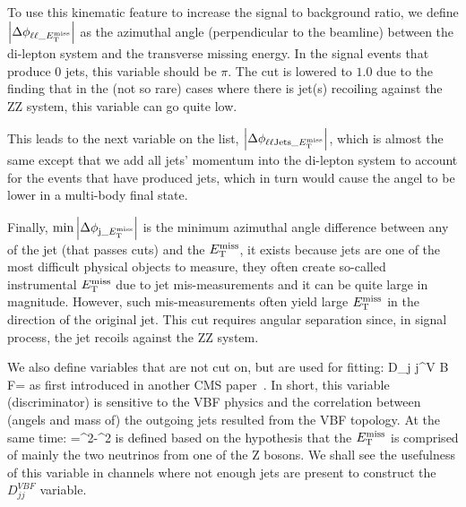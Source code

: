To use this kinematic feature to increase the signal to background ratio, we define 
$\abs{\Delta\phi_{\ell\ell\_E_{\mathrm{T}}^{\mathrm{miss}}}}$ as the azimuthal angle (perpendicular to 
the beamline) between the di-lepton system and the transverse missing energy. In the
signal events that produce 0 jets, this variable should be $\pi$. The cut is lowered to $1.0$ 
due to the finding that in the (not so rare) cases where there is jet(s) recoiling against
the ZZ system, this variable can go quite low.

This leads to the next variable on the list, $\abs{\Delta\phi_{\ell\ell\mathrm{Jets}\_E_{\mathrm{T}}^{\mathrm{miss}}}}$, which
is almost the same except that we add all jets' momentum into the di-lepton system to account
for the events that have produced jets, which in turn would cause the angel to be lower in
a multi-body final state.


Finally, $\min{\abs{ \Delta\phi_{\mathrm{j}\_E_{\mathrm{T}}^{\mathrm{miss}}}}}$ is the minimum azimuthal angle difference between
any of the jet (that passes cuts) and the $E_{\mathrm{T}}^{\mathrm{miss}}$, it exists because jets are one of the 
most difficult physical objects to measure, they often create so-called instrumental $E_{\mathrm{T}}^{\mathrm{miss}}$ due to jet
mis-measurements and it can be quite large in magnitude. However, such mis-measurements often yield large
$E_{\mathrm{T}}^{\mathrm{miss}}$ in the direction of the original jet. This cut requires angular separation since, in signal process,
the jet recoils against the ZZ system.

We also define variables that are not cut on, but are used for fitting:
\be
D_{j j}^{V B F}=
\ee
as first introduced in another CMS paper~\cite{djjvbf}. In short, this variable (discriminator) is sensitive
to the VBF physics and the correlation between (angels and mass of) the outgoing jets resulted from the
VBF topology. At the same time:
\be
\mtzz={}^2-^{2}
\ee
is defined based on the hypothesis that the $E_{\mathrm{T}}^{\mathrm{miss}}$ is comprised of mainly the two neutrinos
from one of the Z bosons. We shall see the usefulness of this variable in channels where
not enough jets are present to construct the $D_{j j}^{V B F}$ variable.

